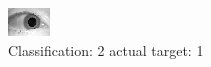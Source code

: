 \begin{figure}[h!]
\begin{center}
\includegraphics[width=0.60\columnwidth]{figures/ID1458_class_2_target_1.png}
\end{center}
\caption{ Classification: 2 actual target: 1}
\label{fig:ID1458_class_2_target_1}
\end{figure}
